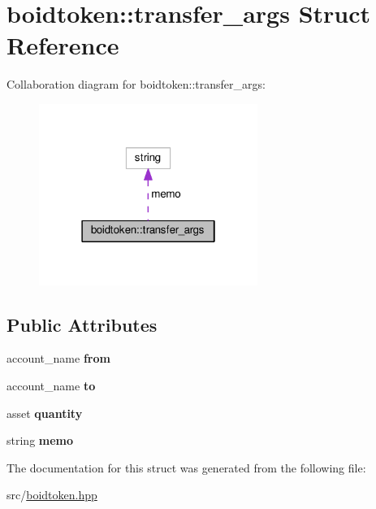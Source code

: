 \hypertarget{structboidtoken_1_1transfer__args}{}\section{boidtoken\+:\+:transfer\+\_\+args Struct Reference}
\label{structboidtoken_1_1transfer__args}


Collaboration diagram for boidtoken\+:\+:transfer\+\_\+args\+:
\nopagebreak
\begin{figure}[H]
\begin{center}
\leavevmode
\includegraphics[width=202pt]{structboidtoken_1_1transfer__args__coll__graph}
\end{center}
\end{figure}
\subsection*{Public Attributes}
\begin{DoxyCompactItemize}
\item 
account\+\_\+name {\bfseries from}\hypertarget{structboidtoken_1_1transfer__args_a1fcbad3886dffa5be4229e793f9e5e27}{}\label{structboidtoken_1_1transfer__args_a1fcbad3886dffa5be4229e793f9e5e27}

\item 
account\+\_\+name {\bfseries to}\hypertarget{structboidtoken_1_1transfer__args_a50bbce49431bde906e51c18670c8d055}{}\label{structboidtoken_1_1transfer__args_a50bbce49431bde906e51c18670c8d055}

\item 
asset {\bfseries quantity}\hypertarget{structboidtoken_1_1transfer__args_a71596eabbe596a15a28256a5b2fcabdd}{}\label{structboidtoken_1_1transfer__args_a71596eabbe596a15a28256a5b2fcabdd}

\item 
string {\bfseries memo}\hypertarget{structboidtoken_1_1transfer__args_af285115b0c02cbcc81cac19b75fc1449}{}\label{structboidtoken_1_1transfer__args_af285115b0c02cbcc81cac19b75fc1449}

\end{DoxyCompactItemize}


The documentation for this struct was generated from the following file\+:\begin{DoxyCompactItemize}
\item 
src/\hyperlink{boidtoken_8hpp}{boidtoken.\+hpp}\end{DoxyCompactItemize}
